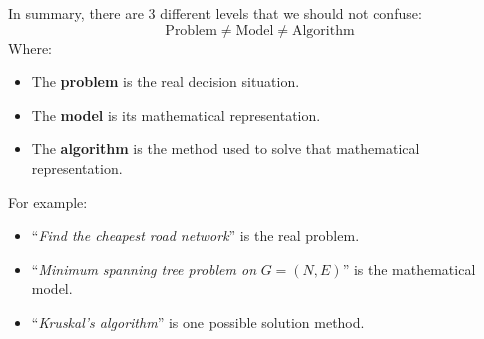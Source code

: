 \highspace
In summary, there are 3 different levels that we should not confuse:
\begin{equation*}
    \text{Problem}
    \neq
    \text{Model}
    \neq
    \text{Algorithm}
\end{equation*}
Where:
\begin{itemize}
    \item The \textbf{problem} is the real decision situation.
    \item The \textbf{model} is its mathematical representation.
    \item The \textbf{algorithm} is the method used to solve that mathematical representation.
\end{itemize}
For example:
\begin{itemize}
    \item ``\emph{Find the cheapest road network}'' is the real problem.
    \item ``\emph{Minimum spanning tree problem on }$G=(N,E)$'' is the mathematical model.
    \item ``\emph{Kruskal's algorithm}'' is one possible solution method.
\end{itemize}

